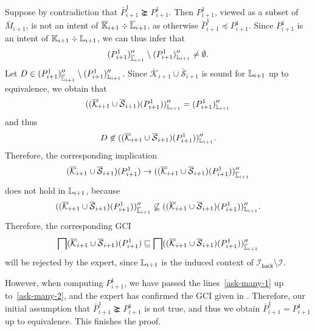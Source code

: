 \begin{Proof}
  Suppose by contradiction that $\bar P_{i+1}^{1} \succneq P_{i+1}^{1}$.  Then
  $P_{i+1}^{1}$, viewed as a subset of $\bar M_{i+1}$, is not an intent of $\overline{{\mathbb{K}}}_{i+1} \div \overline{{\mathbb{L}}}_{i+1}$, as otherwise $\bar P_{i+1}^{1} \preceq
  P_{i+1}^{1}$.  Since $P_{i+1}^{1}$ is an intent of ${\mathbb{K}}_{i+1} \div {\ensuremath{\mathbb{L}}}_{i+1}$, we
  can thus infer that
  \begin{equation*}
    (P_{i+1}^{1})_{\overline{{\mathbb{L}}}_{i+1}}'' \setminus (P_{i+1}^{1})_{{\mathbb{L}}_{i+1}}'' \neq \emptyset.
  \end{equation*}
  Let $D \in (P_{i+1}^{1})_{\overline{{\mathbb{L}}}_{i+1}}'' \setminus (P_{i+1}^{1})_{{\mathbb{L}}_{i+1}}''$.  Since $\bar{\mathcal{K}}_{i+1} \cup \bar{\mathcal{S}}_{i+1}$ is sound
  for ${\mathbb{L}}_{i+1}$ up to equivalence, we obtain that
  \begin{equation*}
    ((\overline{\mathcal{K}}_{i+1} \cup \overline{\mathcal{S}}_{i+1})(P_{i+1}^{1}))_{{\mathbb{L}}_{i+1}}''
    = (P_{i+1}^{1})_{{\mathbb{L}}_{i+1}}''
  \end{equation*}
  and thus
  \begin{equation*}
    D \not\in ((\overline{\mathcal{K}}_{i+1} \cup \overline{\mathcal{S}}_{i+1})(P_{i+1}^{1}))_{{\mathbb{L}}_{i+1}}''.
  \end{equation*}
  Therefore, the corresponding implication
  \begin{equation*}
    (\overline{\mathcal{K}}_{i+1} \cup \overline{\mathcal{S}}_{i+1})(P_{i+1}^{1})
    \to ((\overline{\mathcal{K}}_{i+1} \cup \overline{\mathcal{S}}_{i+1})(P_{i+1}^{1}))_{\overline{{\mathbb{L}}}_{i+1}}''
  \end{equation*}
  does not hold in ${\mathbb{L}}_{i+1}$, because
  \begin{equation*}
    ((\overline{\mathcal{K}}_{i+1} \cup \overline{\mathcal{S}}_{i+1})(P_{i+1}^{1}))_{\overline{{\mathbb{L}}}_{i+1}}''
    \not\subseteq ((\overline{\mathcal{K}}_{i+1} \cup
    \overline{\mathcal{S}}_{i+1})(P_{i+1}^{1}))_{{\mathbb{L}}_{i+1}}''.
  \end{equation*}
  Therefore, the corresponding GCI
  \begin{equation}
    \label{eq:59}
    \bigsqcap(\overline{\mathcal{K}}_{i+1} \cup \overline{\mathcal{S}}_{i+1})(P_{i+1}^{1})
    \sqsubseteq \bigsqcap ((\overline{\mathcal{K}}_{i+1} \cup
    \overline{\mathcal{S}}_{i+1})(P_{i+1}^{1}))_{\overline{{\mathbb{L}}}_{i+1}}''
  \end{equation}
  will be rejected by the expert, since ${\mathbb{L}}_{i+1}$ is the induced context of
  $\mathcal{I}_{\mathsf{back}} \setminus \mathcal{I}$.

  However, when computing $P_{i+1}^{1}$, we have passed the lines~\ref{ask-many-1} up
  to~\ref{ask-many-2}, and the expert has confirmed the GCI given in
  . Therefore, our initial assumption that $\bar P_{i+1}^{1} \succneq
  P_{i+1}^{1}$ is not true, and thus we obtain $\bar P_{i+1}^{1} = P_{i+1}^{1}$ up to
  equivalence.  This finishes the proof.
\end{Proof}

